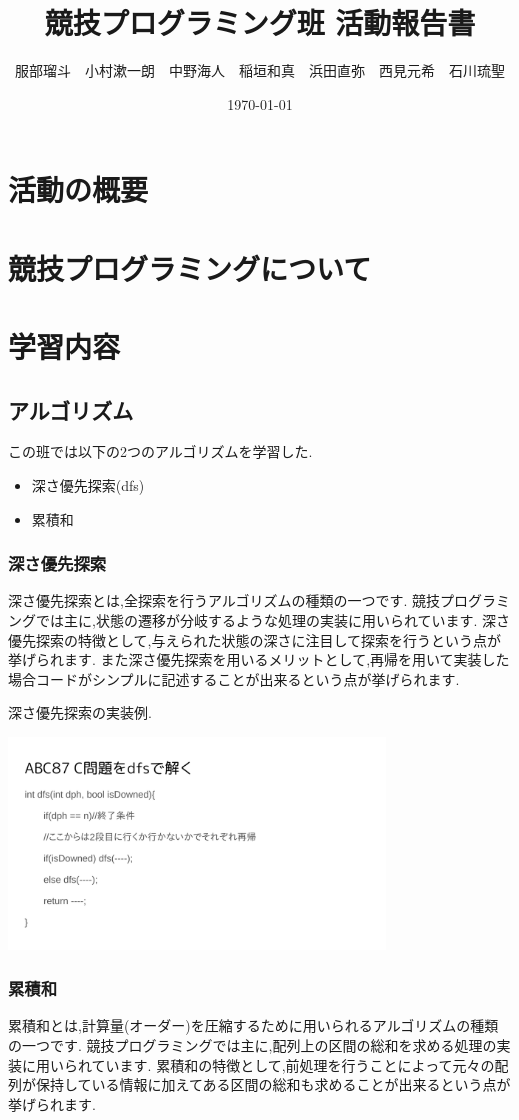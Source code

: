 \documentclass[11pt,a4paper]{jsarticle}
\title{競技プログラミング班 活動報告書}
\author{服部瑠斗　小村漱一朗　中野海人　稲垣和真　浜田直弥　西見元希　石川琉聖}
\date{\today}
\begin{document}
\maketitle
%
%
\section{活動の概要}
\section{競技プログラミングについて}
\section{学習内容}

\subsection{アルゴリズム}
この班では以下の2つのアルゴリズムを学習した.
\begin{itemize}
    \item 深さ優先探索(dfs)
    \item 累積和
\end{itemize}

\subsubsection{深さ優先探索}
深さ優先探索とは,全探索を行うアルゴリズムの種類の一つです.
競技プログラミングでは主に,状態の遷移が分岐するような処理の実装に用いられています.
深さ優先探索の特徴として,与えられた状態の深さに注目して探索を行うという点が挙げられます.
また深さ優先探索を用いるメリットとして,再帰を用いて実装した場合コードがシンプルに記述することが出来るという点が挙げられます.

深さ優先探索の実装例.

\includegraphics[width=10cm]{dfs.png}

\subsubsection{累積和}
累積和とは,計算量(オーダー)を圧縮するために用いられるアルゴリズムの種類の一つです.
競技プログラミングでは主に,配列上の区間の総和を求める処理の実装に用いられています.
累積和の特徴として,前処理を行うことによって元々の配列が保持している情報に加えてある区間の総和も求めることが出来るという点が挙げられます.
\end{document}
